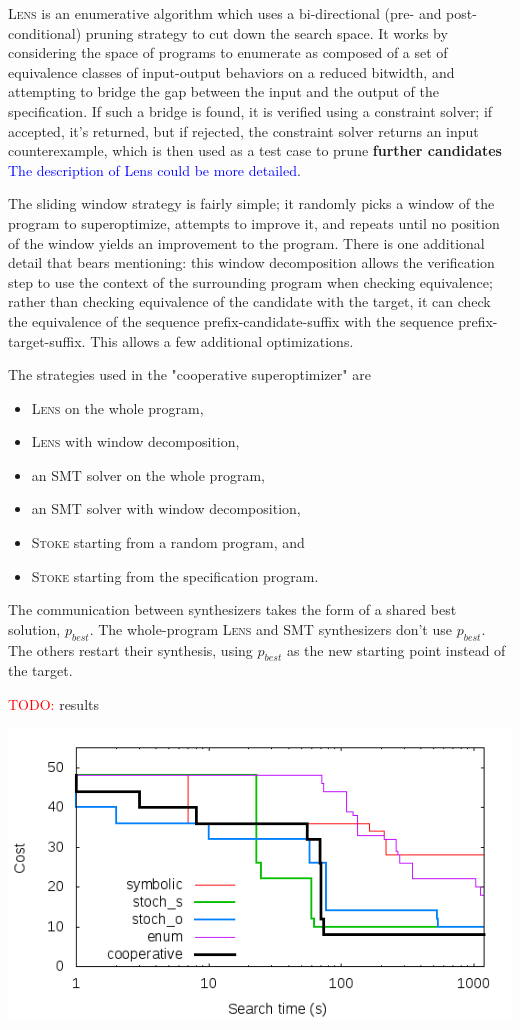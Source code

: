 \documentclass[12pt,twoside]{reedthesis}
\newcommand{\red}[1]{\textcolor{red}{#1}}
\newcommand{\comment}[2]{\textbf{#1} \textcolor{blue}{#2}}
\begin{document}
\textsc{Lens} is an enumerative algorithm which uses a bi-directional (pre- and post-conditional) pruning strategy to cut down the search space.
It works by considering the space of programs to enumerate as composed of a set of equivalence classes of input-output behaviors on a reduced bitwidth, and attempting to bridge the gap between the input and the output of the specification.
If such a bridge is found, it is verified using a constraint solver;
        if accepted, it's returned,
        but if rejected, the constraint solver returns an input counterexample,
    which is then used as a test case to prune
    \comment{further candidates}{The description of Lens could be more detailed}.

The sliding window strategy is fairly simple; it randomly picks a window of the program to superoptimize, attempts to improve it, and repeats until no position of the window yields an improvement to the program.
There is one additional detail that bears mentioning: 
    this window decomposition allows the verification step to use the context of the surrounding program when checking equivalence;
    rather than checking equivalence of the candidate with the target, it can check the equivalence of the sequence prefix-candidate-suffix with the sequence prefix-target-suffix.
This allows a few additional optimizations.

The strategies used in the "cooperative superoptimizer" are
\begin{itemize}
    \item \textsc{Lens} on the whole program,
    \item \textsc{Lens} with window decomposition,
    \item an SMT solver on the whole program,
    \item an SMT solver with window decomposition,
    \item \textsc{Stoke} starting from a random program, and
    \item \textsc{Stoke} starting from the specification program.
\end{itemize}
The communication between synthesizers takes the form of a shared best solution, $p_{best}$.
The whole-program \textsc{Lens} and SMT synthesizers don't use $p_{best}$. The others restart their synthesis, using $p_{best}$ as the new starting point instead of the target.

\red{TODO:} results

\includegraphics[scale=0.5]{scaling}
\end{document}
